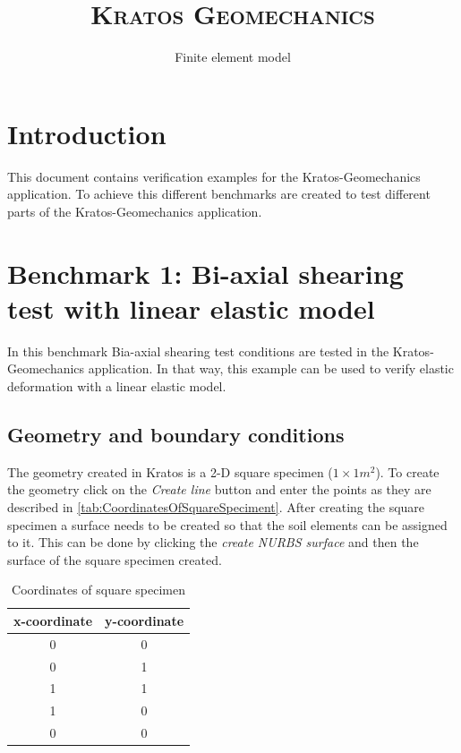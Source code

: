 \documentclass{deltares_manual_style}
\begin{document}

\title{\textsc{Kratos Geomechanics}}
\subtitle{Finite element model}
\manualtitle

\chapter{Introduction}\label{intro}
This document contains verification examples for the Kratos-Geomechanics application. To achieve this different benchmarks 
are created to test different parts of the Kratos-Geomechanics application. 
 
\chapter{Benchmark 1: Bi-axial shearing test with linear elastic model} \label{chap:bench1}
In this benchmark Bia-axial shearing test conditions are tested in the Kratos-Geomechanics application. In that way, 
this example can be used to verify elastic deformation with a linear elastic model.

\section{Geometry and boundary conditions}
The geometry created in Kratos is a 2-D square specimen ($1\times1m^{2}$). To create the geometry click on the \textit{Create line}
button and enter the points as they are described in \autoref{tab:CoordinatesOfSquareSpeciment}. After creating the square specimen
a surface needs to be created so that the soil elements can be assigned to it. This can be done by clicking the \textit{create NURBS surface} and then the surface of the square specimen created. 
\begin{table}[h]
	\caption{Coordinates of square specimen}
	\label{tab:CoordinatesOfSquareSpeciment}
	\centering
		\begin{tabular}{|c|c|}
			\hline
			x-coordinate & y-coordinate \\ \hline
			0 & 0 \\ \hline
			0 & 1 \\ \hline
			1 & 1 \\ \hline
			1 & 0 \\ \hline
			0 & 0 \\ \hline
		\end{tabular}
\end{table}
\end{document}
